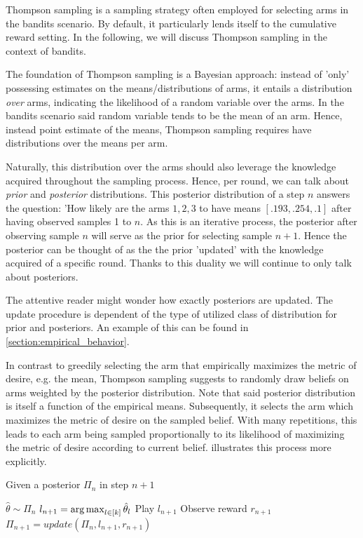 Thompson sampling is a sampling strategy often employed for selecting arms in the bandits scenario. By default, it particularly lends itself to the cumulative reward setting. In the following, we will discuss Thompson sampling in the context of bandits.

The foundation of Thompson sampling is a Bayesian approach: instead of 'only' possessing estimates on the means/distributions of arms, it entails a distribution \emph{over} arms, indicating the likelihood of a random variable over the arms. In the bandits scenario said random variable tends to be the mean of an arm. Hence, instead point estimate of the means, Thompson sampling requires have distributions over the means per arm.

Naturally, this distribution over the arms should also leverage the knowledge acquired throughout the sampling process. Hence, per round, we can talk about \emph{prior} and \emph{posterior} distributions. This posterior distribution of a step $n$ answers the question: 'How likely are the arms $1, 2, 3$ to have means $[.193, .254, .1]$ after having observed samples 1 to $n$. As this is an iterative process, the posterior after observing sample $n$ will serve as the prior for selecting sample $n+1$. Hence the posterior can be thought of as the the prior 'updated' with the knowledge acquired of a specific round. Thanks to this duality we will continue to only talk about posteriors.

The attentive reader might wonder how exactly posteriors are updated. The update procedure is dependent of the type of utilized class of distribution for prior and posteriors. An example of this can be found in \ref{section:empirical_behavior}.

In contrast to greedily selecting the arm that empirically maximizes the metric of desire, e.g. the mean, Thompson sampling suggests to randomly draw beliefs on arms weighted by the posterior distribution. Note that said posterior distribution is itself a function of the empirical means. Subsequently, it selects the arm which maximizes the metric of desire on the sampled belief. With many repetitions, this leads to each arm being sampled proportionally to its likelihood of maximizing the metric of desire according to current belief.  illustrates this process more explicitly.

\begin{algorithm}[H]
    \caption{Given a posterior $\Pi_n$ in step $n+1$}
    \label{alg:thompson_sampling}
  \begin{algorithmic}
    \State $\hat{\theta} \sim \Pi_n$
    \State $l_{n+1} = \operatorname*{arg\,max}_{l \in [k]}\hat{\theta}_l$
    \State Play $l_{n+1}$
    \State Observe reward $r_{n+1}$
    \State $\Pi_{n + 1} = update(\Pi_n, l_{n+1}, r_{n+1})$
  \end{algorithmic}
\end{algorithm}

